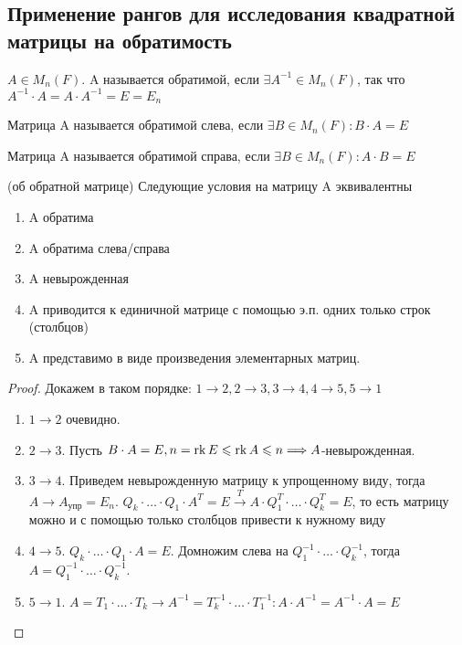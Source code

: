 \subsection{Применение рангов для исследования квадратной матрицы на обратимость}
\begin{definition}
	\(A\in M_n(F)\). A называется обратимой, если \(\exists A^{-1}\in M_n(F)\), так что \(A^{-1}\cdot A = A\cdot A^{-1}=E=E_n\)
\end{definition}
\begin{definition}
	Матрица A называется обратимой слева, если \(\exists B\in M_n(F): B\cdot A = E\)
\end{definition}
\begin{definition}
	Матрица A называется обратимой справа, если \(\exists B\in M_n(F): A\cdot B = E\)
\end{definition}
\begin{theorem}
	(об обратной матрице) \newline
	Следующие условия на матрицу A эквивалентны 
	\begin{enumerate}
		\item A обратима 
		\item A обратима слева/справа
		\item A невырожденная
		\item A приводится к единичной матрице с помощью э.п. одних только строк (столбцов)
		\item A представимо в виде произведения элементарных матриц.
	\end{enumerate}
\end{theorem}
\begin{proof}
	Докажем в таком порядке: \(1\to 2, 2\to 3, 3\to 4, 4\to 5, 5\to 1\)
	\begin{enumerate}
		\item \(1\to 2\) очевидно.
		\item \(2\to 3\). Пусть \(B\cdot A = E, n = \operatorname{rk} E \leqslant \operatorname{rk} A\leqslant n\Longrightarrow A\)-невырожденная.
		\item \(3\to 4\). Приведем невырожденную матрицу к упрощенному виду, тогда \(A\to A_{\text{упр}} = E_n\). \(Q_k\cdot\ldots\cdot Q_1\cdot A^T = E \overset{T}{\to}A\cdot Q_1^T\cdot\ldots\cdot Q_k^T = E\), то есть матрицу можно и с помощью только столбцов привести к нужному виду
		\item \(4\to 5\). \(Q_k\cdot \ldots\cdot Q_1\cdot A =  E\). Домножим слева на \(Q_1^{-1}\cdot\ldots\cdot Q_k^{-1}\), тогда \(A = Q_1^{-1}\cdot\ldots\cdot Q_k^{-1}\).
		\item \(5\to 1\). \(A = T_1 \cdot \ldots \cdot T_k \longrightarrow A^{-1} = T_k^{-1}\cdot\ldots\cdot T_1^{-1}: A\cdot A^{-1} = A^{-1}\cdot A = E\)
	\end{enumerate}
\end{proof}
